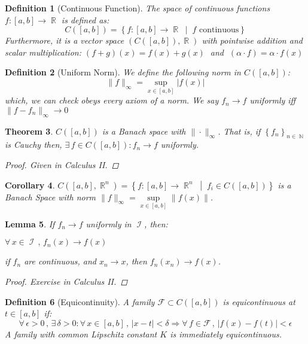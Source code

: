 \documentclass[12pt]{article}
\let\RA\Rightarrow
\newcommand{\set}[2]{\left\{{#1}\;\middle|\;{#2}\right\}}
\newcommand{\Forall}[1]{\forall\,{#1}\,,\,}
\newcommand{\Exist}[1]{\exists\,{#1}:}
\DeclareMathOperator{\R}{\mathbb{R}}
\DeclareMathOperator{\N}{\mathbb{N}}
\DeclareMathOperator{\I}{\mathcal{I}}
\newcommand{\seq}[2][n]{{\left\{#2\right\}}_{#1\in\N}}
\newtheorem{theorem}{Theorem}[subsection]
\newtheorem{definition}[theorem]{Definition}
\newtheorem{lemma}[theorem]{Lemma}
\newtheorem{corollary}[theorem]{Corollary}
\begin{document}
\begin{definition}[Continuous Function]
  The space of continuous functions $f:[a,b]\to\R$ is defined as: $$C([a,b])=\set{f:[a,b]\to\R}{f\text{ continuous}}$$
  Furthermore, it is a vector space $(C([a,b]),\R)$ with pointwise addition and scalar multiplication:
  $(f+g)(x)=f(x)+g(x)\;$ and $\;(\alpha\cdot f)=\alpha\cdot f(x)$
\end{definition}

\begin{definition}[Uniform Norm]
  We define the following norm in $C([a,b])$:
  $$\|f\|_\infty= \sup\limits_{x\in [a,b]}|f(x)|$$
  which, we can check obeys every axiom of a norm. We say $f_n\to f$ uniformly iff $\|f-f_n\|_\infty\to 0$
\end{definition}

\begin{theorem}
  \label{continuous_fn_banach}
  $C([a,b])$ is a Banach space with $\|\cdot\|_\infty$. That is, if $\seq{f_n}$ is Cauchy then, $\Exist{f\in C([a,b])}f_n\to f$ uniformly.
  \begin{proof}
    Given in Calculus II.
  \end{proof}
\end{theorem}

\begin{corollary}
  \label{continuous_Rn_banach}
  $C([a,b],\R^n)=\set{f:[a,b]\to\R^n}{f_i\in C([a,b])}$ is a Banach Space with norm $\|f\|_\infty= \sup\limits_{x\in [a,b]}\|f(x)\|$.
\end{corollary}

\begin{lemma}
  \label{convergence_lemma}
  If $f_n\to f$ uniformly in $\I$, then:
  \begin{compactenum}
    \item $\Forall{x\in\I}f_n(x)\to f(x)$
    \item if $f_n$ are continuous, and $x_n\to x$, then $f_n(x_n)\to f(x)$.
  \end{compactenum}
  \begin{proof}
    Exercise in Calculus II.
  \end{proof}
\end{lemma}

\begin{definition}[Equicontinuity]
  \label{def_equicontinuous}
  A family $\mathcal{F}\subset C([a,b])$ is equicontinuous at $t\in[a,b]$ if: $$\Forall{\epsilon>0}\Exist{\delta>0}\Forall{x\in[a,b]}|x-t|<\delta\RA \Forall{f\in\mathcal{F}}|f(x)-f(t)|<\epsilon$$ A family with common Lipschitz constant $K$ is immediately equicontinuous.
\end{definition}
\end{document}
